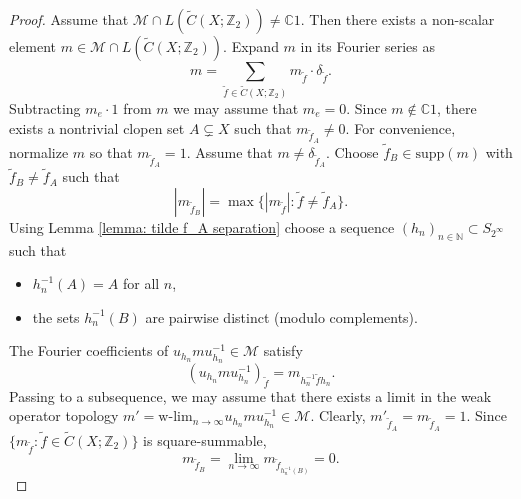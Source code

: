 \documentclass[11pt]{amsart}
\theoremstyle{plain}
\theoremstyle{definition}
\theoremstyle{remark}
\numberwithin{equation}{section}
\begin{document}
\begin{proof}
Assume that $\mathcal{M} \cap L(\widetilde C(X;\mathbb{Z}_2)) \ne \mathbb{C}1$. Then there exists a non-scalar element $m \in \mathcal{M} \cap L(\widetilde C(X;\mathbb{Z}_2))$. Expand $m$ in its Fourier series as
\begin{equation}\label{eq:fourier_expansion}
m = \sum_{\widetilde f \in \widetilde C(X;\mathbb{Z}_2)} m_{\widetilde f} \cdot \delta_{\widetilde f}.
\end{equation} Subtracting $m_e\cdot 1$ from $m$ we may assume that $m_e=0$. 
Since $m \notin \mathbb{C}1$, there exists a nontrivial clopen set $A \subsetneq X$ such that $m_{\widetilde f_A} \ne 0$. For convenience, normalize $m$ so that $m_{\widetilde f_A} = 1$. Assume that $m\neq \delta_{\widetilde f_A}$. Choose $\widetilde f_B \in \text{supp}(m)$ with $\widetilde f_B \ne \widetilde f_A$ such that
\[
|m_{\widetilde f_B}| = \max\{|m_{\widetilde f}| : \widetilde f \ne \widetilde f_A\}.
\]
Using  Lemma \ref{lemma: tilde f_A separation} choose a sequence $(h_n)_{n \in \mathbb{N}} \subset S_{2^\infty}$ such that
\begin{itemize}
    \item $h_n^{-1}(A) = A$ for all $n$,
    \item the sets $h_n^{-1}(B)$ are pairwise distinct (modulo complements).
\end{itemize}
The Fourier coefficients of $ u_{h_n} m u_{h_n}^{-1} \in \mathcal{M}$ satisfy
\[ (u_{h_n} m u_{h_n}^{-1})_{\widetilde f} = m_{h_n^{-1}\widetilde f h_n}.\]
Passing to a subsequence, we may assume that there exists a limit in the weak operator topology $m' = \mathrm{w\text{-}lim}_{n \to \infty}u_{h_n} m u_{h_n}^{-1}\in\mathcal M$. Clearly, $m'_{\widetilde f_A}=m_{\widetilde f_A}=1$. Since $\{m_{\widetilde f}:\widetilde f\in \widetilde C(X;\mathbb{Z}_2)\}$ is square-summable, $$m_{\widetilde f_B}=\lim\limits_{n\to \infty}m_{\widetilde f_{h_n^{-1}(B)}}=0.$$


\end{proof}
\end{document}
